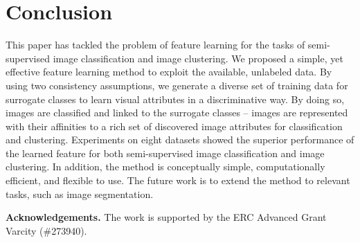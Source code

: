 \documentclass[preprint,12pt,3p]{elsarticle}
\begin{document}
\section{Conclusion} 
\label{sec:conclusion}
This paper has tackled the problem of feature learning for the tasks of
semi-supervised image classification and image clustering.  We
proposed a simple, yet effective feature learning method to exploit the available,
unlabeled data. By using two consistency assumptions, we generate a diverse set of
training data for surrogate classes to learn visual attributes in a
discriminative way.  By doing so, images are classified and linked to
the surrogate classes -- images are represented with their affinities
to a rich set of discovered image attributes for classification and
clustering. Experiments on eight datasets showed the superior
performance of the learned feature for both semi-supervised image
classification and image clustering. In addition, the method is
conceptually simple, computationally efficient, and flexible to use.
The future work is to extend the method to relevant tasks, such as image segmentation.



\noindent
\textbf{Acknowledgements.} The work is supported by the ERC Advanced Grant Varcity (\#273940).


{
\small


}
\end{document}

